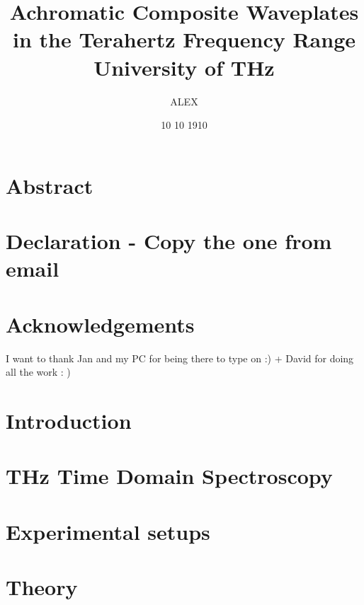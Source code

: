 \documentclass[12pt, a4paper]{report}
\title{
{Achromatic Composite Waveplates in the Terahertz Frequency Range}\\
{\large University of THz}\\
}
\author{ALEX}
\date{10 10 1910}
\begin{document}
\maketitle

\chapter*{Abstract}


\chapter*{Declaration - Copy the one from email} %

\chapter*{Acknowledgements}
I want to thank Jan and my PC for being there to type on :) + David for doing all the work : )

\tableofcontents %



\chapter{Introduction}

\chapter{THz Time Domain Spectroscopy}

\chapter{Experimental setups}

\chapter{Theory}
\end{document}
